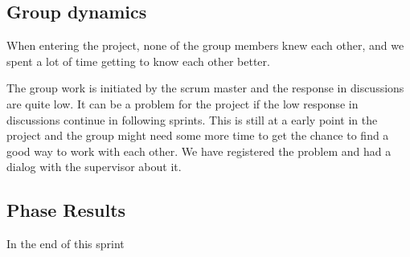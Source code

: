 \subsection{Group dynamics}
	When entering the project, none of the group members knew each other, and we spent a lot
	of time getting to know each other better.

	The group work is initiated by the scrum master and the response in discussions are quite low.
	It can be a problem for the project if the low response in discussions 
	continue in following sprints. This is still at a early point in the project and the group might need
	some more time to get the chance to find a good way to work with each other. 
	We have registered the problem and had a dialog with the supervisor about it. 

\subsection{Phase Results}
	In the end of this sprint

